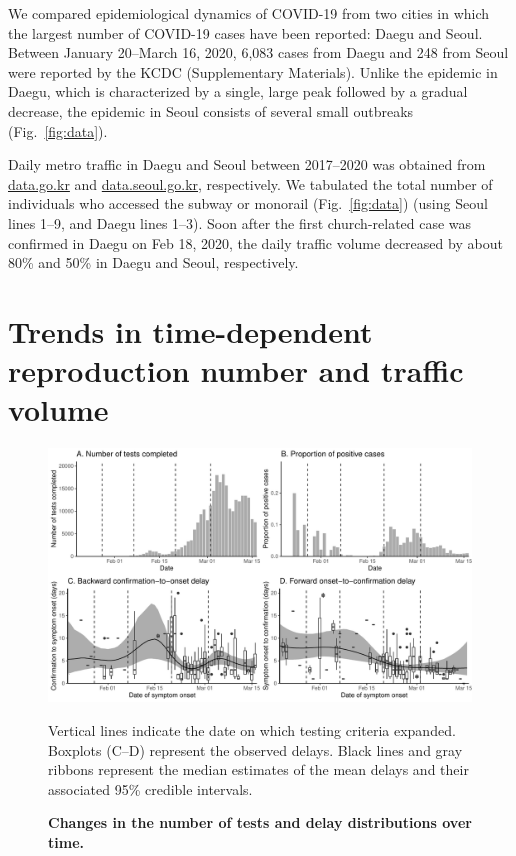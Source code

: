 \documentclass[12pt]{article}
\newcommand{\fref}[1]{Fig.~\ref{fig:#1}}
\begin{document}
We compared epidemiological dynamics of COVID-19 from two cities in which the largest number of COVID-19 cases have been reported: Daegu and Seoul.
Between January 20--March 16, 2020, 6,083 cases from Daegu and 248 from Seoul were reported by the KCDC (Supplementary Materials).
Unlike the epidemic in Daegu, which is characterized by a single, large peak followed by a gradual decrease, the epidemic in Seoul consists of several small outbreaks (\fref{data}).

Daily metro traffic in Daegu and Seoul between 2017--2020 was obtained from \url{data.go.kr} and \url{data.seoul.go.kr}, respectively.
We tabulated the total number of individuals who accessed the subway or monorail (\fref{data}) (using Seoul lines 1--9, and Daegu lines 1--3).
Soon after the first church-related case was confirmed in Daegu on Feb 18, 2020, the daily traffic volume decreased by about 80\% and 50\% in Daegu and Seoul, respectively.


\section{Trends in time-dependent reproduction number and traffic volume}

\begin{figure}[!ht]
\includegraphics[width=\textwidth]{figure_report_delay.pdf}
\caption{
\textbf{Changes in the number of tests and delay distributions over time.}
}
Vertical lines indicate the date on which testing criteria expanded.
Boxplots (C--D) represent the observed delays.
Black lines and gray ribbons represent the median estimates of the mean delays and their associated 95\% credible intervals.
\label{fig:dist}
\end{figure}
\end{document}

